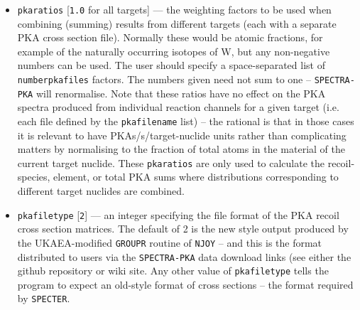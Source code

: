 \documentclass[a4paper]{article}
\begin{document}
\begin{itemize}
\item \texttt{pka{\textunderscore}ratios} [\texttt{1.0} for all targets] --- the weighting factors to be used when combining (summing) results from different targets (each with a separate PKA cross section file). Normally these would be atomic fractions, for example of the naturally occurring isotopes of W, but any non-negative numbers can be used. The user should specify a space-separated list of \texttt{number{\textunderscore}pka{\textunderscore}files} factors. The numbers given need not sum to one -- \texttt{SPECTRA-PKA} will renormalise. Note that these ratios have no effect on the PKA spectra produced from individual reaction channels for a given target (i.e. each file defined by the \texttt{pka{\textunderscore}filename} list) -- the rational is that in those cases it is relevant to have PKAs/s/target-nuclide units rather than complicating matters by normalising to the fraction of total atoms in the material of the current target nuclide. These \texttt{pka{\textunderscore}ratios} are only used to calculate the recoil-species, element, or total PKA sums where distributions corresponding to different target nuclides are combined.


\item \texttt{pka{\textunderscore}filetype} [\texttt{2}] --- an integer specifying the file format of the PKA recoil cross section matrices. The default of 2 is the new style output produced by the UKAEA-modified \texttt{GROUPR} routine of \texttt{NJOY} -- and this is the format distributed to users via the \texttt{SPECTRA-PKA} data download links (see either the github repository or wiki site. Any other value of \texttt{pka{\textunderscore}filetype} tells the program to expect an old-style format of cross sections -- the format required by \texttt{SPECTER}.



\end{itemize}
\end{document}
